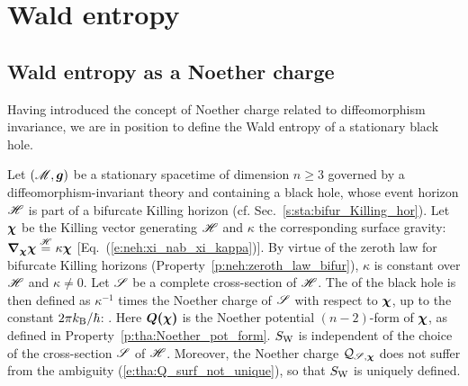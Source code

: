 
\section{Wald entropy}

\subsection{Wald entropy as a Noether charge}

Having introduced the concept of Noether charge related to diffeomorphism invariance,
we are in position to define the Wald entropy of a stationary black hole.

\begin{prop}
Let $(\mathscr{M},\bm{g})$ be a stationary spacetime of dimension $n\geq 3$ governed
by a diffeomorphism-invariant theory and containing a black hole, whose
event horizon $\mathscr{H}$ is part of a bifurcate Killing horizon (cf. Sec.~\ref{s:sta:bifur_Killing_hor}).
Let $\bm{\chi}$ be the Killing
vector generating $\mathscr{H}$ and $\kappa$ the corresponding surface gravity:
$\bm{\nabla}_{\bm{\chi}}\bm{\chi} \stackrel{\mathscr{H}}{=} \kappa \bm{\chi}$ [Eq.~(\ref{e:neh:xi_nab_xi_kappa})].
By virtue of the zeroth law for bifurcate Killing horizons (Property~\ref{p:neh:zeroth_law_bifur}),
$\kappa$ is constant over $\mathscr{H}$ and $\kappa \neq 0$.
Let $\mathscr{S}$ be a complete cross-section of $\mathscr{H}$.
The  of the black hole is
then defined as $\kappa^{-1}$ times
the Noether charge of $\mathscr{S}$ with respect to $\bm{\chi}$,
up to the constant $2\pi k_{\rm B}/\hbar$:
\be \label{e:tha:def_Wald_entropy}
     .
\ee
Here $\bm{Q}\textbf{(}\bm{\chi}\textbf{)}$ is the Noether potential $(n-2)$-form of $\bm{\chi}$,
as defined in Property~\ref{p:tha:Noether_pot_form}.
$S_{\rm W}$ is independent of the choice of the cross-section $\mathscr{S}$ of $\mathscr{H}$.
Moreover, the Noether charge $\mathcal{Q}_{\mathscr{S},\bm{\chi}}$ does not suffer from
the ambiguity (\ref{e:tha:Q_surf_not_unique}), so that $S_{\rm W}$ is uniquely defined.
\end{prop}

